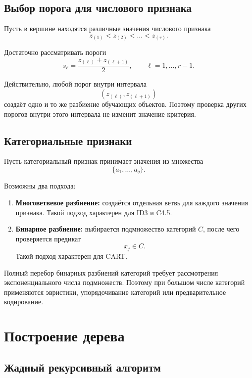 \documentclass[12pt,a4paper]{article}
\theoremstyle{plain}
\theoremstyle{definition}
\theoremstyle{remark}
\begin{document}
\subsection{Выбор порога для числового признака}

Пусть в вершине находятся различные значения числового признака
\[
    z_{(1)}<z_{(2)}<\ldots<z_{(r)}.
\]

Достаточно рассматривать пороги
\[
    s_\ell
    =
    \frac{z_{(\ell)}+z_{(\ell+1)}}{2},
    \qquad
    \ell=1,\ldots,r-1.
\]

Действительно, любой порог внутри интервала
\[
    (z_{(\ell)},z_{(\ell+1)})
\]
создаёт одно и то же разбиение обучающих объектов. Поэтому проверка
других порогов внутри этого интервала не изменит значение критерия.

\subsection{Категориальные признаки}

Пусть категориальный признак принимает значения из множества
\[
    \{a_1,\ldots,a_q\}.
\]

Возможны два подхода:
\begin{enumerate}
    \item \textbf{Многоветвевое разбиение:}
    создаётся отдельная ветвь для каждого значения признака.
    Такой подход характерен для ID3 и C4.5.
    \item \textbf{Бинарное разбиение:}
    выбирается подмножество категорий $C$, после чего проверяется
    предикат
    \[
        x_j\in C.
    \]
    Такой подход характерен для CART.
\end{enumerate}

Полный перебор бинарных разбиений категорий требует рассмотрения
экспоненциального числа подмножеств. Поэтому при большом числе категорий
применяются эвристики, упорядочивание категорий или предварительное
кодирование.

\section{Построение дерева}

\subsection{Жадный рекурсивный алгоритм}
\end{document}
